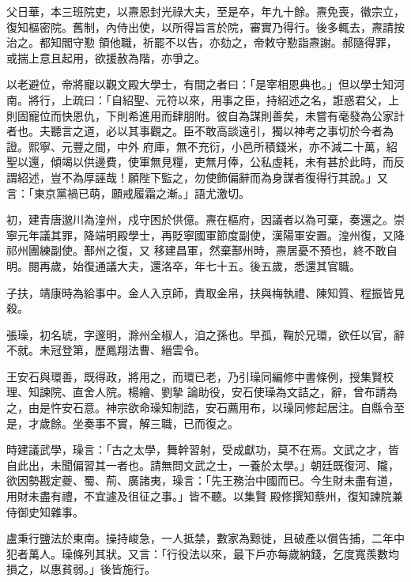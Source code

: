 \begin{pinyinscope}
 父日華，本三班院吏，以燾恩封光祿大夫，至是卒，年九十餘。燾免喪，徽宗立，復知樞密院。舊制，內侍出使，以所得旨言於院，審實乃得行。後多輒去，燾請按治之。都知閻守懃
 領他職，祈罷不以告，亦劾之，帝敕守懃詣燾謝。郝隨得罪，或揣上意且起用，欲援赦為階，亦爭之。



 以老避位，帝將寵以觀文殿大學士，有間之者曰：「是宰相恩典也。」但以學士知河南。將行，上疏曰：「自紹聖、元符以來，用事之臣，持紹述之名，誑惑君父，上則固寵位而快恩仇，下則希進用而肆朋附。彼自為謀則善矣，未嘗有毫發為公家計者也。夫聽言之道，必以其事觀之。臣不敢高談遠引，獨以神考之事切於今者為證。熙寧、元豐之間，中外
 府庫，無不充衍，小邑所積錢米，亦不減二十萬，紹聖以還，傾竭以供邊費，使軍無見糧，吏無月俸，公私虛耗，未有甚於此時，而反謂紹述，豈不為厚誣哉！願陛下監之，勿使飾偏辭而為身謀者復得行其說。」又言：「東京黨禍已萌，願戒履霜之漸。」語尤激切。



 初，建青唐邈川為湟州，戍守困於供億。燾在樞府，因議者以為可棄，奏還之。崇寧元年議其罪，降端明殿學士，再貶寧國軍節度副使，漢陽軍安置。湟州復，又降祁州團練副使。鄯州之復，又
 移建昌軍，然棄鄯州時，燾居憂不預也，終不敢自明。閱再歲，始復通議大夫，還洛卒，年七十五。後五歲，悉還其官職。



 子扶，靖康時為給事中。金人入京師，責取金帛，扶與梅執禮、陳知質、程振皆見殺。



 張璪，初名琥，字邃明，滁州全椒人，洎之孫也。早孤，鞠於兄環，欲任以官，辭不就。未冠登第，歷鳳翔法曹、縉雲令。



 王安石與環善，既得政，將用之，而環已老，乃引璪同編修中書條例，授集賢校理、知諫院、直舍人院。楊繪、劉摯
 論助役，安石使璪為文詰之，辭，曾布請為之，由是忤安石意。神宗欲命璪知制誥，安石薦用布，以璪同修起居注。自縣令至是，才歲餘。坐奏事不實，解三職，已而復之。



 時建議武學，璪言：「古之太學，舞幹習射，受成獻功，莫不在焉。文武之才，皆自此出，未聞偏習其一者也。請無問文武之士，一養於太學。」朝廷既復河、隴，欲因勢戡定夔、蜀、荊、廣諸夷，璪言：「先王務治中國而已。今生財未盡有道，用財未盡有禮，不宜遽及徂征之事。」皆不聽。以集賢
 殿修撰知蔡州，復知諫院兼侍御史知雜事。



 盧秉行鹽法於東南。操持峻急，一人抵禁，數家為黥徙，且破產以償告捕，二年中犯者萬人。璪條列其狀。又言：「行役法以來，最下戶亦每歲納錢，乞度寬羨數均損之，以惠貧弱。」後皆施行。




\end{pinyinscope}
